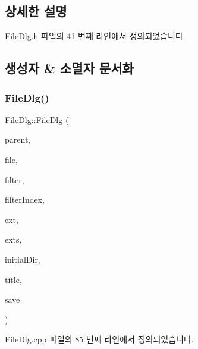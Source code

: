 \subsection{상세한 설명}


File\+Dlg.\+h 파일의 41 번째 라인에서 정의되었습니다.



\subsection{생성자 \& 소멸자 문서화}
\mbox{\label{class_file_dlg_a0a793ed11256c5a8d5d12d01e13e5eea}} 
\subsubsection{\texorpdfstring{File\+Dlg()}{FileDlg()}}
{\footnotesize\ttfamily File\+Dlg\+::\+File\+Dlg (\begin{DoxyParamCaption}\item[{C\+Wnd $\ast$}]{parent,  }\item[{L\+P\+C\+T\+S\+TR}]{file,  }\item[{L\+P\+C\+T\+S\+TR}]{filter,  }\item[{\mbox{\hyperlink{_util_8cpp_a0ef32aa8672df19503a49fab2d0c8071}{int}}}]{filter\+Index,  }\item[{L\+P\+C\+T\+S\+TR}]{ext,  }\item[{L\+P\+C\+T\+S\+TR $\ast$}]{exts,  }\item[{L\+P\+C\+T\+S\+TR}]{initial\+Dir,  }\item[{L\+P\+C\+T\+S\+TR}]{title,  }\item[{bool}]{save }\end{DoxyParamCaption})}



File\+Dlg.\+cpp 파일의 85 번째 라인에서 정의되었습니다.


